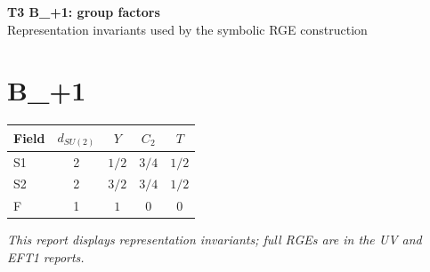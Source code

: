 \documentclass[10pt,a4paper]{article}
\begin{document}
\begin{center}
{\Large\bfseries T3 B\_+1: group factors}\\[4pt]
Representation invariants used by the symbolic RGE construction
\end{center}
\bigskip
\section*{B\_+1}
\begin{longtable}{@{}lcccc@{}}
\toprule Field & $d_{SU(2)}$ & $Y$ & $C_2$ & $T$ \\
\midrule
S1 & 2 & $1/2$ & $3/4$ & $1/2$ \\
S2 & 2 & $3/2$ & $3/4$ & $1/2$ \\
F & 1 & $1$ & $0$ & $0$ \\
\bottomrule
\end{longtable}
\emph{This report displays representation invariants; full RGEs are in the UV and EFT1 reports.}
\end{document}
